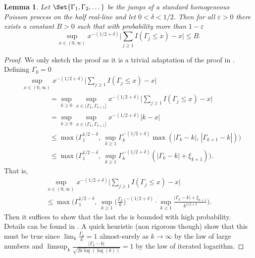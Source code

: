 \documentclass{article}
\newtheorem{lemma}{Lemma}
\newcommand{\1}{\boldsymbol{1}}
\theoremstyle{plain}
\begin{document}
\begin{lemma}
  \label{lem:poissoncdf}
  Let $\Set{\Gamma_1,\Gamma_2,\dots}$ be the jumps of a standard homogeneous Poisson process on the half real-line and let $0 < \delta < 1/2$. Then for all $\varepsilon > 0$ there exists a constant $B > 0$ such that with probability more than $1 - \varepsilon$
  \begin{equation*}
    \sup_{x\in (0,\infty)} x^{-(1/2 + \delta)}\Big| \sum_{j\geq 1}I(\Gamma_j \leq x) - x\Big| \leq B.
  \end{equation*}
\end{lemma}
\begin{proof}
  We only sketch the proof as it is a trivial adaptation of the proof in \cite[Lemma~B.1]{Fav(22)}. Defining $\Gamma_0 = 0$
  \begin{align*}
    &\sup_{x\in (0,\infty)} x^{-(1/2 + \delta)}\Big| \sum_{j\geq 1}I(\Gamma_j \leq x) - x\Big|\\
    &\qquad\qquad= \sup_{k\geq 0}\sup_{x\in (\Gamma_k,\Gamma_{k+1}]} x^{-(1/2 + \delta)}\Big| \sum_{j\geq 1}I(\Gamma_j \leq x) - x\Big|\\
    &\qquad\qquad= \sup_{k\geq 0}\sup_{x\in (\Gamma_k,\Gamma_{k+1}]} x^{-(1/2 + \delta)}| k - x|\\
    &\qquad\qquad\leq \max\Big(\Gamma_1^{1/2 - \delta},\ \sup_{k\geq 1}\Gamma_k^{-(1/2+\delta)}\max(|\Gamma_{k} - k|,\,|\Gamma_{k+1} - k|) \Big)\\
    &\qquad\qquad\leq \max\Big(\Gamma_1^{1/2-\delta},\ \sup_{k\geq 1}\Gamma_k^{-(1/2+\delta)}(|\Gamma_{k} - k| + \xi_{k+1}) \Big).
  \end{align*}
  That is,
  \begin{multline*}
    \sup_{x\in (0,\infty)} x^{-(1/2 + \delta)}\Big| \sum_{j\geq 1}I(\Gamma_j \leq x) - x\Big|\\
    \leq \max\Bigg(\Gamma_1^{1/2-\delta},\ \sup_{k\geq 1}\Big(\frac{\Gamma_k}{k}\Big)^{-(1/2+\delta)}\cdot\sup_{k\geq 1}\frac{|\Gamma_{k} - k| + \xi_{k+1}}{k^{1/2+\delta}} \Bigg).
  \end{multline*}
  Then it suffices to show that the last rhs is bounded with high probability. Details can be found in \cite[Lemma~B.1]{Fav(22)}. A quick heuristic (non rigorous though) show that this must be true since $\lim_k\frac{\Gamma_k}{k} = 1$ almost-surely as $k\to \infty$ by the law of large numbers and $\limsup_k\frac{|\Gamma_k - k|}{\sqrt{2k\log(\log(k))}} = 1$ by the law of iterated logarithm.
\end{proof}
\end{document}
